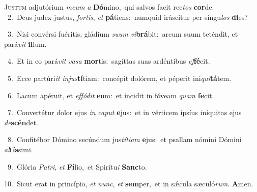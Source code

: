 \lettrine{\initial\textcolor{\initialcolor}{J}}{ustum} adjutórium \textit{me}\-\textit{um} \textit{a} \textbf{Dó}\-mino,~\star qui salvos facit rec\textit{tos} \textbf{cor}\-de.\\
{\numbfont\textcolor{\numbcolor}{~2.}}~Deus judex justus, \textit{for}\-\textit{tis}, \textit{et} \textbf{pá}\-tiens:~\star numquid iráscitur per síngu\textit{los} \textbf{di}\-es?\par
{\numbfont\textcolor{\numbcolor}{~3.}}~Nisi convérsi fuéritis, gládium \textit{su}\-\textit{um} \textit{vi}\-\textbf{brá}bit:~\star arcum suum teténdit, et pará\textit{vit} \textbf{il}\-lum.\par
{\numbfont\textcolor{\numbcolor}{~4.}}~Et in eo pará\textit{vit} \textit{va}\-\textit{sa} \textbf{mor}\-tis:~\star sagíttas suas ardéntibus \textit{ef}\-\textbf{fé}cit.\par
{\numbfont\textcolor{\numbcolor}{~5.}}~Ecce partúri\textit{it} \textit{in}\-\textit{jus}\textbf{tí}tiam:~\star concépit dolórem, et péperit ini\-\textit{qui}\-\textbf{tá}tem.\par
{\numbfont\textcolor{\numbcolor}{~6.}}~Lacum apéruit, et \textit{ef}\-\textit{fó}\textit{dit} \textbf{e}\-um:~\star et íncidit in fóveam \textit{quam} \textbf{fe}\-cit.\par
{\numbfont\textcolor{\numbcolor}{~7.}}~Convertétur dolor ejus \textit{in} \textit{ca}\-\textit{put} \textbf{e}\-jus:~\star et in vérticem ipsíus iníquitas ejus \textit{de}\-\textbf{scén}det.\par
{\numbfont\textcolor{\numbcolor}{~8.}}~Confitébor Dómino secúndum jus\-\textit{tí}\-\textit{ti}\textit{am} \textbf{e}\-jus:~\star et psallam nómini Dómini \textit{al}\-\textbf{tís}simi.\par
{\numbfont\textcolor{\numbcolor}{~9.}}~Glória \textit{Pa}\-\textit{tri}, \textit{et} \textbf{Fí}\-lio,~\star et Spirítu\textit{i} \textbf{Sanc}\-to.\par
{\numbfont\textcolor{\numbcolor}{10.}}~Sicut erat in princípio, \textit{et} \textit{nunc}\-, \textit{et} \textbf{sem}\-per,~\star et in sǽcula sæculó\-\textit{rum}\-. \textbf{A}\-men.\par
